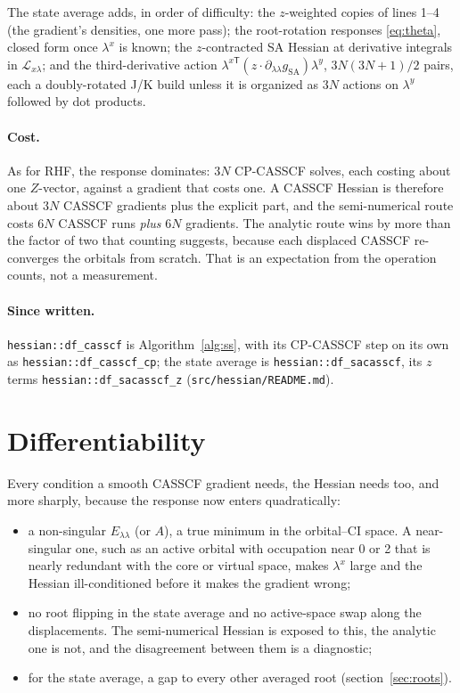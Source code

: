 \documentclass[11pt]{article}
\newcommand{\code}[1]{\texttt{#1}}
\newcommand{\Lag}{\mathcal L}
\begin{document}
The state average adds, in order of difficulty: the $z$-weighted copies
of lines 1--4 (the gradient's densities, one more pass); the root-rotation
responses \eqref{eq:theta}, closed form once $\lambda^x$ is known; the
$z$-contracted SA Hessian at derivative integrals in $\Lag_{x\lambda}$;
and the third-derivative action $\lambda^{x\mathsf T}(z\cdot
\partial_{\lambda\lambda}g_{\mathrm{SA}})\lambda^y$, $3N(3N+1)/2$ pairs,
each a doubly-rotated J/K build unless it is organized as $3N$ actions
on $\lambda^y$ followed by dot products.

\paragraph{Cost.} As for RHF, the response dominates: $3N$ CP-CASSCF
solves, each costing about one $Z$-vector, against a gradient that costs
one. A CASSCF Hessian is therefore about $3N$ CASSCF gradients plus the
explicit part, and the semi-numerical route costs $6N$ CASSCF runs
\emph{plus} $6N$ gradients. The analytic route wins by more than the
factor of two that counting suggests, because each displaced CASSCF
re-converges the orbitals from scratch. That is an expectation from the
operation counts, not a measurement.

\paragraph{Since written.} \code{hessian::df\_casscf} is
Algorithm~\ref{alg:ss}, with its CP-CASSCF step on its own as
\code{hessian::df\_casscf\_cp}; the state average is
\code{hessian::df\_sacasscf}, its $z$ terms \code{hessian::df\_sacasscf\_z}
(\code{src/hessian/README.md}).

\section{Differentiability}
\label{sec:diff}

Every condition a smooth CASSCF gradient needs, the Hessian needs too,
and more sharply, because the response now enters quadratically:
\begin{itemize}
  \item a non-singular $E_{\lambda\lambda}$ (or $A$), a true minimum in the
        orbital--CI space. A near-singular one, such as an active orbital
        with occupation near 0 or 2 that is nearly redundant with the core
        or virtual space, makes $\lambda^x$ large and the Hessian
        ill-conditioned before it makes the gradient wrong;
  \item no root flipping in the state average and no active-space swap
        along the displacements. The semi-numerical Hessian is exposed to
        this, the analytic one is not, and the disagreement between them
        is a diagnostic;
  \item for the state average, a gap to every other averaged root
        (section~\ref{sec:roots}).
\end{itemize}
\end{document}
